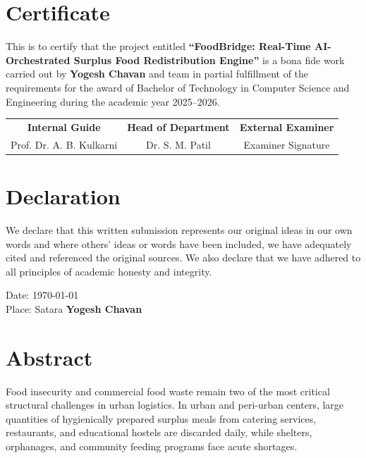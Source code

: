 \documentclass[12pt,a4paper,oneside]{report}
\begin{document}
\chapter*{Certificate}
\thispagestyle{plain}
This is to certify that the project entitled \textbf{``FoodBridge: Real-Time AI-Orchestrated Surplus Food Redistribution Engine''} is a bona fide work carried out by \textbf{Yogesh Chavan} and team in partial fulfillment of the requirements for the award of Bachelor of Technology in Computer Science and Engineering during the academic year 2025--2026.

\vspace{2.5cm}
\noindent
\begin{tabular*}{\textwidth}{@{\extracolsep{\fill}}ccc}
    \textbf{Internal Guide} & \textbf{Head of Department} & \textbf{External Examiner} \\
    Prof. Dr. A. B. Kulkarni & Dr. S. M. Patil & Examiner Signature \\
\end{tabular*}

\clearpage

\chapter*{Declaration}
\thispagestyle{plain}
We declare that this written submission represents our original ideas in our own words and where others' ideas or words have been included, we have adequately cited and referenced the original sources. We also declare that we have adhered to all principles of academic honesty and integrity.

\vspace{1.5cm}
\noindent
Date: \today \\
Place: Satara \hfill \textbf{Yogesh Chavan}

\clearpage

\chapter*{Abstract}
\thispagestyle{plain}
Food insecurity and commercial food waste remain two of the most critical structural challenges in urban logistics. In urban and peri-urban centers, large quantities of hygienically prepared surplus meals from catering services, restaurants, and educational hostels are discarded daily, while shelters, orphanages, and community feeding programs face acute shortages. 
\end{document}

